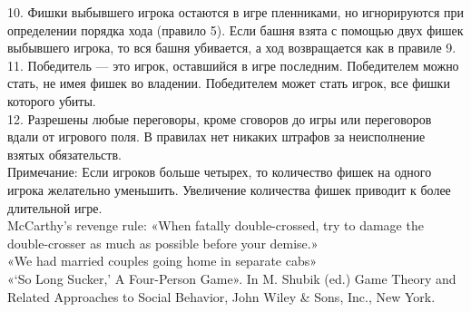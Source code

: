 \begin{problem} 
10. Фишки выбывшего игрока остаются в игре пленниками, но игнорируются при определении порядка хода (правило 5). Если башня взята с помощью двух фишек выбывшего игрока, то вся башня убивается, а ход возвращается как в правиле 9.\\
11. Победитель — это игрок, оставшийся в игре последним. Победителем можно стать, не имея фишек во владении. Победителем может стать игрок, все фишки которого убиты.\\
12. Разрешены любые переговоры, кроме сговоров до игры или переговоров вдали от игрового поля. В правилах нет никаких штрафов за неисполнение взятых обязательств.\\
Примечание: Если игроков больше четырех, то количество фишек на одного игрока желательно уменьшить. Увеличение количества фишек приводит к более длительной игре.\\
McCarthy's revenge rule: «When fatally double-crossed, try to damage the double-crosser as much as possible before your demise.»\\
«We had married couples going home in separate cabs»\\
«`So Long Sucker,' A Four-Person Game». In M. Shubik (ed.) Game Theory and Related Approaches to Social Behavior, John Wiley \& Sons, Inc., New York.



\begin{sol}

\end{sol}
\end{problem}







